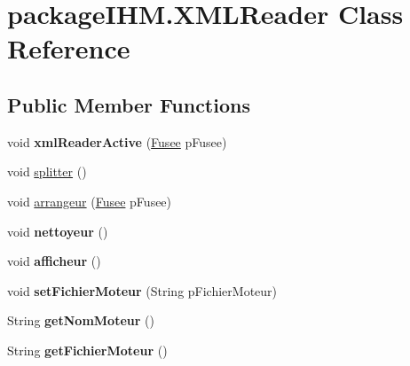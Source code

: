 \hypertarget{classpackage_i_h_m_1_1_x_m_l_reader}{}\section{package\+I\+H\+M.\+X\+M\+L\+Reader Class Reference}
\label{classpackage_i_h_m_1_1_x_m_l_reader}
\subsection*{Public Member Functions}
\begin{DoxyCompactItemize}
\item 
\mbox{\label{classpackage_i_h_m_1_1_x_m_l_reader_a4969a78a69e9f65472e7dfc40689baac}} 
void {\bfseries xml\+Reader\+Active} (\mbox{\hyperlink{classpackage_i_h_m_1_1_fusee}{Fusee}} p\+Fusee)
\item 
void \mbox{\hyperlink{classpackage_i_h_m_1_1_x_m_l_reader_a08e6efd00cdf8f85131c9e7aceaebea7}{splitter}} ()
\item 
void \mbox{\hyperlink{classpackage_i_h_m_1_1_x_m_l_reader_a2d78bb962cb1fd2e06a795d618be108c}{arrangeur}} (\mbox{\hyperlink{classpackage_i_h_m_1_1_fusee}{Fusee}} p\+Fusee)
\item 
\mbox{\label{classpackage_i_h_m_1_1_x_m_l_reader_ae9dc6ed02613319fc885578d6de256ce}} 
void {\bfseries nettoyeur} ()
\item 
\mbox{\label{classpackage_i_h_m_1_1_x_m_l_reader_a30ae12374f7f3756f98903c447d5c447}} 
void {\bfseries afficheur} ()
\item 
\mbox{\label{classpackage_i_h_m_1_1_x_m_l_reader_a99610d65956379d3d7a18529bb586fff}} 
void {\bfseries set\+Fichier\+Moteur} (String p\+Fichier\+Moteur)
\item 
\mbox{\label{classpackage_i_h_m_1_1_x_m_l_reader_a52e92b3352087c0671df19ce077c1b4e}} 
String {\bfseries get\+Nom\+Moteur} ()
\item 
\mbox{\label{classpackage_i_h_m_1_1_x_m_l_reader_abf33606918b241db1a460d584f1a5723}} 
String {\bfseries get\+Fichier\+Moteur} ()

\end{DoxyCompactItemize}
